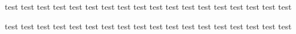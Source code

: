 ﻿\documentclass{ctexart}
\begin{document}
    test test test test test test test test test test test test test test test test\hspace*{5em} test test

    {\setlength{\fboxsep}{0pt}
    \fbox{\parbox{2em}{\rule{2pt}{2em}}}
    }

    test test test test test test test test test test test test test test test test\vspace{2em} test test
\end{document}
